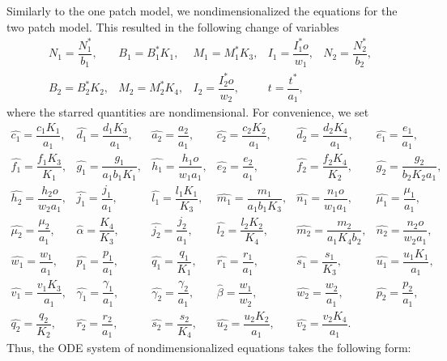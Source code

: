 \documentclass[letter,10pt]{article}
\begin{document}
Similarly to the one patch model, we nondimensionalized the equations for the two patch model. This resulted in the following change of variables
\begin{equation*}
\begin{array}{ccccc}
N_1=\dfrac{N_1^*}{b_1}, & B_1=B_1^*K_1, & M_1=M_1^*K_3, & I_1=\dfrac{I_1^*o}{w_1}, & N_2=\dfrac{N_2^*}{b_2},\\
B_2=B_2^*K_2, & M_2=M_2^*K_4, & I_2=\dfrac{I_2^*o}{w_2}, & t=\dfrac{t^{*}}{a_1}, &
\end{array}
\end{equation*}
where the starred quantities are nondimensional. For convenience, we set 
\begin{equation*}
\begin{array}{llllll}
\hat{c_1}=\dfrac{c_1K_1}{a_1}, & \hat{d_1}=\dfrac{d_1K_3}{a_1}, & \hat{a_2}=\dfrac{a_2}{a_1}, & \hat{c_2}=\dfrac{c_2K_2}{a_1}, & \hat{d_2}=\dfrac{d_2 K_4}{a_1}, & \hat{e_1}=\dfrac{e_1}{a_1},       \\
\hat{f_1}=\dfrac{f_1K_3}{K_1}, & \hat{g_1}=\dfrac{g_1}{a_1b_1K_1}, & \hat{h_1}=\dfrac{h_1o}{w_1a_1}, & \hat{e_2}=\dfrac{e_2}{a_1}, & \hat{f_2}=\dfrac{f_2 K_4}{K_2}, & \hat{g_2}=\dfrac{g_2}{b_2K_2a_1},      \\
\hat{h_2}=\dfrac{h_2o}{w_2a_1}, & \hat{j_1}=\dfrac{j_1}{a_1}, & \hat{l_1}=\dfrac{l_1K_1}{K_3}, & \hat{m_1}=\dfrac{m_1}{a_1b_1K_3}, & \hat{n_1}=\dfrac{n_1o}{w_1a_1}, & \hat{\mu_1}=\dfrac{\mu_1}{a_1},       \\
\hat{\mu_2}=\dfrac{\mu_2}{a_1}, & \hat{\alpha}=\dfrac{K_4}{K_3}, & \hat{j_2}=\dfrac{j_2}{a_1}, & \hat{l_2}=\dfrac{l_2K_2}{K_4}, & \hat{m_2}=\dfrac{m_2}{a_1K_4b_2}, & \hat{n_2}=\dfrac{n_2o}{w_2a_1},       \\
\hat{w_1}=\dfrac{w_1}{a_1}, & \hat{p_1}=\dfrac{p_1}{a_1}, & \hat{q_1}=\dfrac{q_1}{K_1}, & \hat{r_1}=\dfrac{r_1}{a_1}, & \hat{s_1}=\dfrac{s_1}{K_3}, & \hat{u_1}=\dfrac{u_1K_1}{a_1},       \\
\hat{v_1}=\dfrac{v_1K_3}{a_1}, & \hat{\gamma_1}=\dfrac{\gamma_1}{a_1}, & \hat{\gamma_2}=\dfrac{\gamma_2}{a_1}, & \hat{\beta}=\dfrac{w_1}{w_2}, & \hat{w_2}=\dfrac{w_2}{a_1}, & \hat{p_2}=\dfrac{p_2}{a_1},       \\
\hat{q_2}=\dfrac{q_2}{K_2}, & \hat{r_2}=\dfrac{r_2}{a_1}, & \hat{s_2}=\dfrac{s_2}{K_4}, & \hat{u_2}=\dfrac{u_2K_2}{a_1}, & \hat{v_2}=\dfrac{v_2K_4}{a_1}.
\end{array}
\end{equation*}
Thus, the ODE system of  nondimensionalized equations takes the following form:
\end{document}
